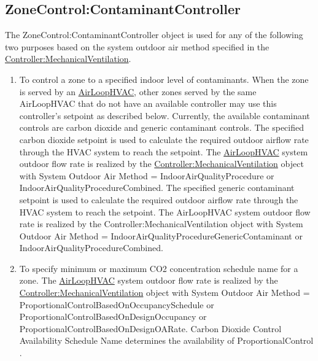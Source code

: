 \subsection{ZoneControl:ContaminantController}\label{zonecontrolcontaminantcontroller}

The ZoneControl:ContaminantController object is used for any of the following two purposes based on the system outdoor air method specified in the \hyperref[controllermechanicalventilation]{Controller:MechanicalVentilation}.

\begin{enumerate}
\def\labelenumi{\arabic{enumi})}
\item
  To control a zone to a specified indoor level of contaminants. When the zone is served by an \hyperref[airloophvac]{AirLoopHVAC}, other zones served by the same AirLoopHVAC that do not have an available controller may use this controller's setpoint as described below. Currently, the available contaminant controls are carbon dioxide and generic contaminant controls. The specified carbon dioxide setpoint is used to calculate the required outdoor airflow rate through the HVAC system to reach the setpoint. The \hyperref[airloophvac]{AirLoopHVAC} system outdoor flow rate is realized by the \hyperref[controllermechanicalventilation]{Controller:MechanicalVentilation} object with System Outdoor Air Method = IndoorAirQualityProcedure or IndoorAirQualityProcedureCombined. The specified generic contaminant setpoint is used to calculate the required outdoor airflow rate through the HVAC system to reach the setpoint. The AirLoopHVAC system outdoor flow rate is realized by the Controller:MechanicalVentilation object with System Outdoor Air Method = IndoorAirQualityProcedureGenericContaminant or IndoorAirQualityProcedureCombined.
\item
  To specify minimum or maximum CO2 concentration schedule name for a zone. The \hyperref[airloophvac]{AirLoopHVAC} system outdoor flow rate is realized by the \hyperref[controllermechanicalventilation]{Controller:MechanicalVentilation} object with System Outdoor Air Method = ProportionalControlBasedOnOccupancySchedule or ProportionalControlBasedOnDesignOccupancy or ProportionalControlBasedOnDesignOARate. Carbon Dioxide Control Availability Schedule Name determines the availability of ProportionalControl .
\end{enumerate}

